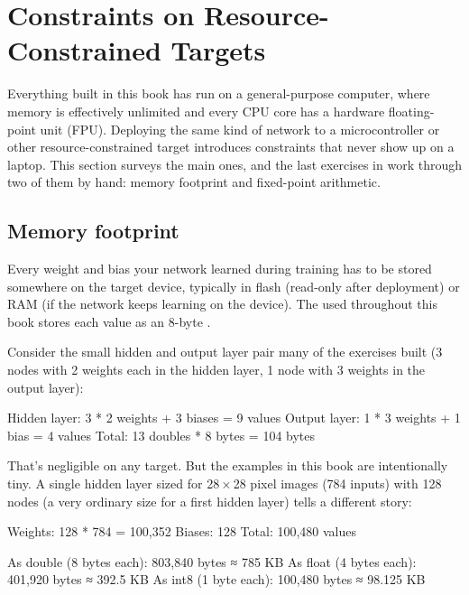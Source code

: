 
\section{Constraints on Resource-Constrained Targets}
\label{c10:sec:embedded}\label{c10:app:d}
Everything built in this book has run on a general-purpose computer, where memory is effectively
unlimited and every CPU core has a hardware floating-point unit (FPU). Deploying the same kind of
network to a microcontroller or other resource-constrained target introduces constraints that never
show up on a laptop. This section surveys the main ones, and the last exercises in
 work through two of them by hand: memory footprint and fixed-point
arithmetic.

\subsection{Memory footprint}
\label{c10:sec:memory}
Every weight and bias your network learned during training has to be stored somewhere on the target
device, typically in flash (read-only after deployment) or RAM (if the network keeps learning on
the device). The  used throughout this book stores each value as an
8-byte .

Consider the small hidden and output layer pair many of the exercises built (3 nodes with 2 weights
each in the hidden layer, 1 node with 3 weights in the output layer):

\begin{console}
Hidden layer: 3 * 2 weights + 3 biases  =  9 values
Output layer: 1 * 3 weights + 1 bias    =  4 values
Total: 13 doubles * 8 bytes             =  104 bytes
\end{console}

\noindent That's negligible on any target. But the examples in this book are intentionally tiny. A
single hidden layer sized for 28\,×\,28 pixel images (784 inputs) with 128 nodes (a very ordinary
size for a first hidden layer) tells a different story:

\begin{console}
Weights: 128 * 784 = 100,352
Biases:  128
Total:   100,480 values

As double (8 bytes each): 803,840 bytes  ≈ 785 KB
As float  (4 bytes each): 401,920 bytes  ≈ 392.5 KB
As int8   (1 byte each):  100,480 bytes  ≈ 98.125 KB
\end{console}

